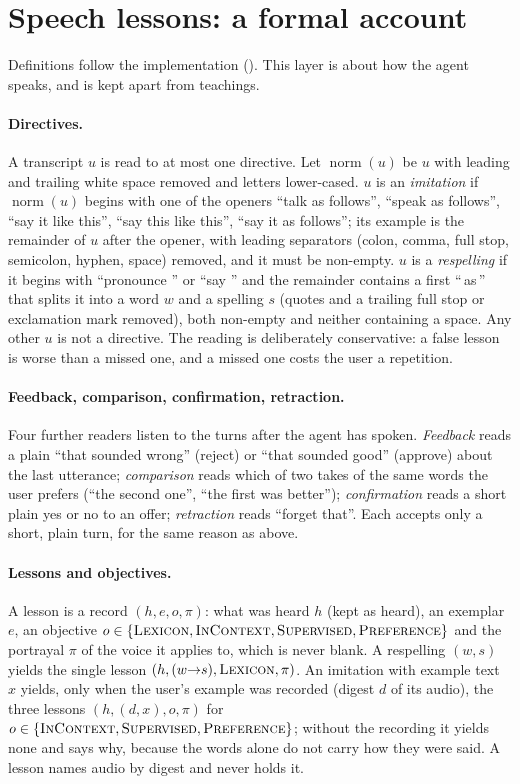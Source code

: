 \section{Speech lessons: a formal account}\label{sec:formalism}

Definitions follow the implementation (). This layer is about how the agent speaks, and is kept apart from teachings.

\paragraph{Directives.}
A transcript $u$ is read to at most one directive. Let $\operatorname{norm}(u)$ be $u$ with leading and
trailing white space removed and letters lower-cased. $u$ is an \emph{imitation} if $\operatorname{norm}(u)$
begins with one of the openers ``talk as follows'', ``speak as follows'', ``say it like this'', ``say this
like this'', ``say it as follows''; its example is the remainder of $u$ after the opener, with leading
separators (colon, comma, full stop, semicolon, hyphen, space) removed, and it must be non-empty. $u$ is a
\emph{respelling} if it begins with ``pronounce '' or ``say '' and the remainder contains a first ``\,as\,'' that
splits it into a word $w$ and a spelling $s$ (quotes and a trailing full stop or exclamation mark removed),
both non-empty and neither containing a space. Any other $u$ is not a directive. The reading is
deliberately conservative: a false lesson is worse than a missed one, and a missed one costs the user
a repetition.

\paragraph{Feedback, comparison, confirmation, retraction.}
Four further readers listen to the turns after the agent has spoken. \emph{Feedback} reads a plain ``that sounded wrong'' (reject) or ``that sounded good'' (approve) about the last utterance; \emph{comparison} reads which of two takes of the same words the user prefers (``the second one'', ``the first was better'');
\emph{confirmation} reads a short plain yes or no to an offer; \emph{retraction} reads ``forget that''. Each accepts only a short, plain turn, for the same reason as above.

\paragraph{Lessons and objectives.}
A lesson is a record $(h, e, o, \pi)$: what was heard $h$ (kept as heard), an exemplar $e$, an objective
$o\in\{\textsc{Lexicon},\textsc{InContext},\textsc{Supervised},\textsc{Preference}\}$ and the portrayal $\pi$ of the voice it
applies to, which is never blank. A respelling $(w,s)$ yields the single lesson $(h, (w{\to}s), \textsc{Lexicon}, \pi)$.
An imitation with example text $x$ yields, only when the user's example was recorded (digest $d$ of its audio), the
three lessons $(h,(d,x),o,\pi)$ for $o\in\{\textsc{InContext},\textsc{Supervised},\textsc{Preference}\}$;
without the recording it yields none and says why, because the words alone do not carry how they were said.
A lesson names audio by digest and never holds it.

